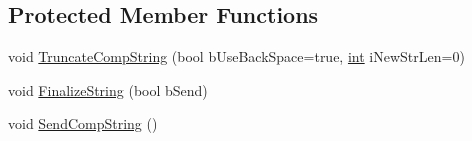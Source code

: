 \subsection*{Protected Member Functions}
\begin{DoxyCompactItemize}
\item 
void \hyperlink{class_c_d_x_u_t_i_m_e_edit_box_acf5f110e7519e5aa82ef1e107bfc0613}{TruncateCompString} (bool bUseBackSpace=true, \hyperlink{_d_x_u_tgui_8cpp_a2d77ed03302b6978834ee3b6f57837fb}{int} iNewStrLen=0)
\item 
void \hyperlink{class_c_d_x_u_t_i_m_e_edit_box_a220c48fee1e5049fc24313a10ef2201f}{FinalizeString} (bool bSend)
\item 
void \hyperlink{class_c_d_x_u_t_i_m_e_edit_box_a1f3cf8e4deb6c0881aa4036b3669825c}{SendCompString} ()
\end{DoxyCompactItemize}
